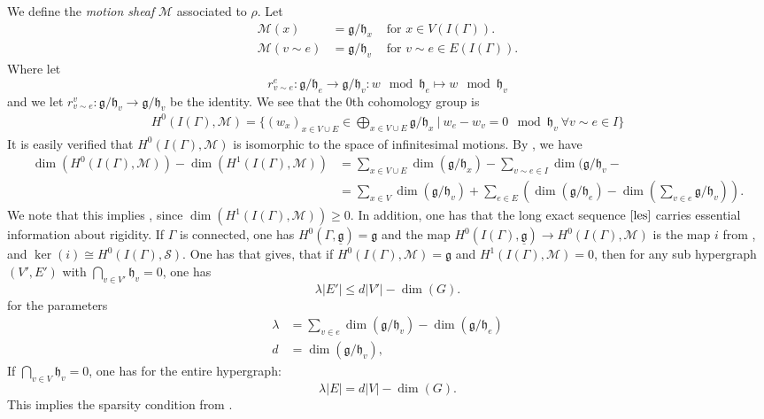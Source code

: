\documentclass{article}
\theoremstyle{definition}
\theoremstyle{remark}
\begin{document}
We define the \textit{motion sheaf} $\mathcal{M}$ associated to $\rho$. Let
\begin{align*}
    \mathcal{M}(x) &= \mathfrak{g}/\mathfrak{h}_x &\text{ for } x\in V(I(\Gamma)).\\
    \mathcal{M}(v\sim e) &= \mathfrak{g}/\mathfrak{h}_v &\text{ for } v\sim e \in E(I(\Gamma)).
\end{align*}
Where let $$r^{e}_{v \sim e}: \mathfrak{g}/\mathfrak{h}_e \rightarrow \mathfrak{g}/\mathfrak{h}_{v}: w \mod \mathfrak{h}_e \mapsto w \mod \mathfrak{h}_v$$ and 
we let $r^{v}_{v \sim e}: \mathfrak{g}/\mathfrak{h}_v \rightarrow \mathfrak{g}/\mathfrak{h}_v$ be the identity. We see that the $0$th cohomology group is
\begin{align*}
    H^{0}(I(\Gamma), \mathcal{M}) = \{ (w_{x})_{x\in V\cup E} \in \bigoplus_{x\in V\cup E} \mathfrak{g}/\mathfrak{h}_x ~\vert ~ w_e - w_{v} = 0 \mod  \mathfrak{h}_v ~\forall  v\sim e \in I\}
\end{align*}
It is easily verified that $H^{0}(I(\Gamma), \mathcal{M})$ is isomorphic to the space of infinitesimal motions. By , we have
\begin{align*}
    \dim(H^{0}(I(\Gamma), \mathcal{M})) - \dim(H^{1}(I(\Gamma), \mathcal{M})) &= \sum_{x\in V\cup E} \dim(\mathfrak{g}/\mathfrak{h}_{x})-\sum_{v\sim e \in I} \dim(\mathfrak{g}/\mathfrak{h}_{v}-\\
     &= \sum_{x\in V} \dim(\mathfrak{g}/\mathfrak{h}_{v}) + \sum_{e \in E}\left( \dim(\mathfrak{g}/\mathfrak{h}_{e}) - \dim(\sum_{v\in e} \mathfrak{g}/\mathfrak{h}_{v}) \right).
\end{align*}
We note that this implies , since $\dim(H^{1}(I(\Gamma), \mathcal{M})) \geq 0$. In addition, one has that the long exact sequence $\eqref{les}$ carries essential information about rigidity. If $\Gamma$ is connected, one has $H^{0}(\Gamma, \underline{\mathfrak{g}}) = \mathfrak{g}$ and the map $H^{0}(I(\Gamma), \underline{\mathfrak{g}}) \rightarrow H^{0}(I(\Gamma), \mathcal{M})$ is the map $i$ from , and $\ker(i) \cong H^{0}(I(\Gamma), \mathcal{S})$. One has that  gives, that if $H^{0}(I(\Gamma), \mathcal{M}) = \mathfrak{g}$ and $H^{1}(I(\Gamma), \mathcal{M}) = 0$, then for any sub hypergraph $(V', E')$ with $\bigcap_{v \in V'} \mathfrak{h}_{v} = 0$, one has 
\begin{equation*}
    \lambda |E'| \leq  d |V'| -\dim(G).
\end{equation*}
for the parameters
\begin{align*}
    \lambda &= \sum_{v\in e}\dim(\mathfrak{g}/\mathfrak{h}_{v}) - \dim(\mathfrak{g}/\mathfrak{h}_{e})\\
    d &= \dim(\mathfrak{g}/\mathfrak{h}_{v}),
\end{align*}
If $\bigcap_{v\in V} \mathfrak{h}_{v}=0$, one has for the entire hypergraph:
\begin{equation*}
    \lambda |E| = d|V| -\dim(G).
\end{equation*}
This implies the sparsity condition from \cite{graphsofgroups}. 
\end{document}
